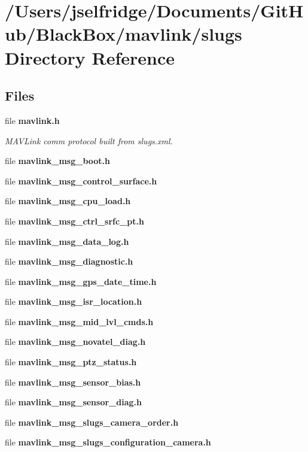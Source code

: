 \section{/\+Users/jselfridge/\+Documents/\+Git\+Hub/\+Black\+Box/mavlink/slugs Directory Reference}
\label{dir_1c07bef996f2d24fd07b5dca6b37a744}
\subsection*{Files}
\begin{DoxyCompactItemize}
\item 
file \textbf{ mavlink.\+h}
\begin{DoxyCompactList}\small\item\em M\+A\+V\+Link comm protocol built from slugs.\+xml. \end{DoxyCompactList}\item 
file \textbf{ mavlink\+\_\+msg\+\_\+boot.\+h}
\item 
file \textbf{ mavlink\+\_\+msg\+\_\+control\+\_\+surface.\+h}
\item 
file \textbf{ mavlink\+\_\+msg\+\_\+cpu\+\_\+load.\+h}
\item 
file \textbf{ mavlink\+\_\+msg\+\_\+ctrl\+\_\+srfc\+\_\+pt.\+h}
\item 
file \textbf{ mavlink\+\_\+msg\+\_\+data\+\_\+log.\+h}
\item 
file \textbf{ mavlink\+\_\+msg\+\_\+diagnostic.\+h}
\item 
file \textbf{ mavlink\+\_\+msg\+\_\+gps\+\_\+date\+\_\+time.\+h}
\item 
file \textbf{ mavlink\+\_\+msg\+\_\+isr\+\_\+location.\+h}
\item 
file \textbf{ mavlink\+\_\+msg\+\_\+mid\+\_\+lvl\+\_\+cmds.\+h}
\item 
file \textbf{ mavlink\+\_\+msg\+\_\+novatel\+\_\+diag.\+h}
\item 
file \textbf{ mavlink\+\_\+msg\+\_\+ptz\+\_\+status.\+h}
\item 
file \textbf{ mavlink\+\_\+msg\+\_\+sensor\+\_\+bias.\+h}
\item 
file \textbf{ mavlink\+\_\+msg\+\_\+sensor\+\_\+diag.\+h}
\item 
file \textbf{ mavlink\+\_\+msg\+\_\+slugs\+\_\+camera\+\_\+order.\+h}
\item 
file \textbf{ mavlink\+\_\+msg\+\_\+slugs\+\_\+configuration\+\_\+camera.\+h}

\end{DoxyCompactItemize}

